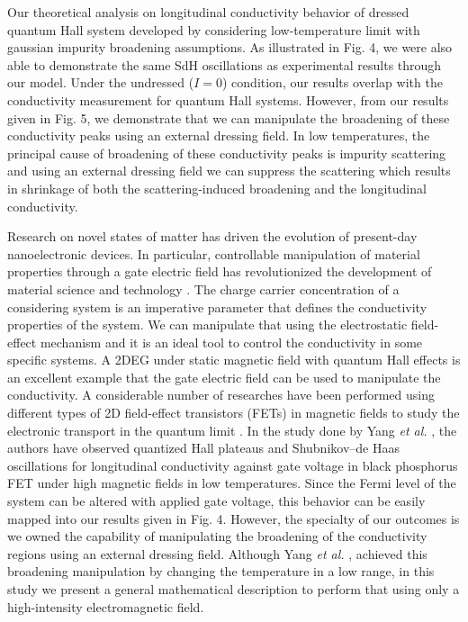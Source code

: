 \documentclass{article}
\begin{document}
\begin{itemize}
{  Our theoretical analysis on longitudinal conductivity behavior of dressed quantum Hall system developed by considering low-temperature limit with gaussian impurity broadening assumptions. As illustrated in Fig. 4, we were also able to demonstrate the same SdH oscillations as experimental results \cite{endo09,wakabayashi78} through our model. Under the undressed ($I=0$) condition, our results overlap with the conductivity measurement for quantum Hall systems. However, from our results given in Fig. 5, we demonstrate that we can manipulate the broadening of these conductivity peaks using an external dressing field. In low temperatures, the principal cause of broadening of these conductivity peaks is impurity scattering and using an external dressing field we can suppress the scattering which results in shrinkage of both the scattering-induced broadening and the longitudinal conductivity.

  Research on novel states of matter has driven the evolution of present-day nanoelectronic devices. In particular, controllable manipulation of material properties through a gate electric field has revolutionized the development of material science and technology \cite{ahn03,deng18}.
  The charge carrier concentration of a considering system is an imperative parameter that defines the conductivity properties of the system. We can manipulate that using the electrostatic field-effect mechanism and it is an ideal tool to control the conductivity in some specific systems.
  A 2DEG under static magnetic field with quantum Hall effects is an excellent example that the gate electric field can be used to manipulate the conductivity. A considerable number of researches have been performed using different types of 2D field-effect transistors (FETs) in magnetic fields to study the electronic transport in the quantum limit \cite{wakabayashi78,yang18,long20,li14}. In the study done by Yang \textit{et al.} \cite{yang18}, the authors have observed quantized Hall plateaus and Shubnikov–de Haas oscillations for longitudinal conductivity against gate voltage in black phosphorus FET under high magnetic fields in low temperatures. Since the Fermi level of the system can be altered with applied gate voltage, this behavior can be easily mapped into our results given in Fig. 4. However, the specialty of our outcomes is we owned the capability of manipulating the broadening of the conductivity regions using an external dressing field. Although Yang \textit{et al.} \cite{yang18}, achieved this broadening manipulation by changing the temperature in a low range, in this study we present a general mathematical description to perform that using only a high-intensity electromagnetic field.

}
\end{itemize}
\end{document}
